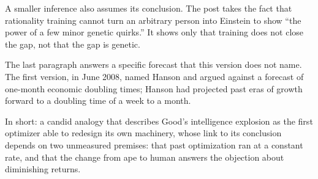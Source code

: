 \begin{afterword}
A smaller inference also assumes its conclusion. The post takes the fact that rationality training cannot turn an arbitrary person into Einstein to show ``the power of a few minor genetic quirks.'' It shows only that training does not close the gap, not that the gap is genetic.

The last paragraph answers a specific forecast that this version does not name. The first version, in June 2008, named Hanson and argued against a forecast of one-month economic doubling times; Hanson had projected past eras of growth forward to a doubling time of a week to a month.

In short: a candid analogy that describes Good's intelligence explosion as the first optimizer able to redesign its own machinery, whose link to its conclusion depends on two unmeasured premises: that past optimization ran at a constant rate, and that the change from ape to human answers the objection about diminishing returns.
\end{afterword}
